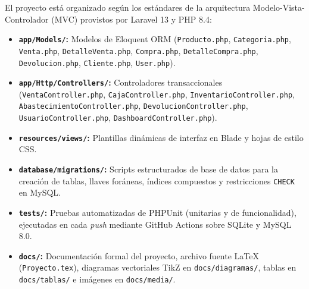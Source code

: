 \documentclass[12pt,a4paper]{article}
\begin{document}
El proyecto está organizado según los estándares de la arquitectura Modelo-Vista-Controlador (MVC) provistos por Laravel 13 y PHP 8.4:

\begin{itemize}
    \item \textbf{\texttt{app/Models/}:} Modelos de Eloquent ORM (\texttt{Producto.php}, \texttt{Categoria.php}, \texttt{Venta.php}, \texttt{DetalleVenta.php}, \texttt{Compra.php}, \texttt{DetalleCompra.php}, \texttt{Devolucion.php}, \texttt{Cliente.php}, \texttt{User.php}).
    \item \textbf{\texttt{app/Http/Controllers/}:} Controladores transaccionales (\texttt{VentaController.php}, \texttt{CajaController.php}, \texttt{InventarioController.php}, \texttt{AbastecimientoController.php}, \texttt{DevolucionController.php}, \texttt{UsuarioController.php}, \texttt{DashboardController.php}).
    \item \textbf{\texttt{resources/views/}:} Plantillas dinámicas de interfaz en Blade y hojas de estilo CSS.
    \item \textbf{\texttt{database/migrations/}:} Scripts estructurados de base de datos para la creación de tablas, llaves foráneas, índices compuestos y restricciones \texttt{CHECK} en MySQL.
    \item \textbf{\texttt{tests/}:} Pruebas automatizadas de PHPUnit (unitarias y de funcionalidad), ejecutadas en cada \emph{push} mediante GitHub Actions sobre SQLite y MySQL 8.0.
    \item \textbf{\texttt{docs/}:} Documentación formal del proyecto, archivo fuente \LaTeX{} (\texttt{Proyecto.tex}), diagramas vectoriales TikZ en \texttt{docs/diagramas/}, tablas en \texttt{docs/tablas/} e imágenes en \texttt{docs/media/}.
\end{itemize}
\end{document}
